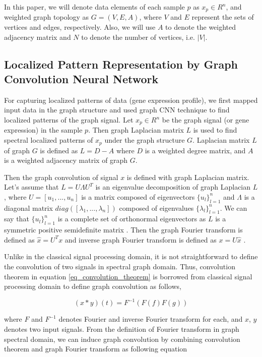 \documentclass{article}
\begin{document}
In this paper, we will denote data elements of each sample $p$ as $x_p \in R^n$, and weighted graph topology as $G = (V,E,A)$, where $V$ and $E$ represent the sets of vertices and edges, respectively. Also, we will use $A$ to denote the weighted adjacency matrix and $N$ to denote the number of vertices, i.e. $|V|$.



\subsection{Localized Pattern Representation by Graph Convolution Neural Network}
For capturing localized patterns of data (gene expression profile), we first mapped input data in the graph structure and used graph CNN technique to find localized patterns of the graph signal.
Let $x_p \in R^{n}$ be the graph signal (or gene expression) in the sample $p$.
Then graph Laplacian matrix $L$ is used to find spectral localized patterns of $x_p$ under the graph structure $G$. Laplacian matrix $L$ of graph $G$ is defined as $L = D - A$ where $D$ is a weighted degree matrix, and $A$ is a weighted adjacency matrix of graph $G$. 

Then the graph convolution of signal $x$ is defined with graph Laplacian matrix. Let's assume that $L = U\Lambda U^T$ is an eigenvalue decomposition of graph Laplacian $L$, where $U = [u_1, ... , u_n]$ is a matrix composed of eigenvectors $\{u_l\}_{l=1}^{n}$ and $\Lambda$ is a diagonal matrix $diag([\lambda_1,...,\lambda_n])$ composed of eigenvalues $\{\lambda_l\}_{l=1}^{n}$. We can say that  $\{u_l\}_{l=1}^{n}$ is a complete set of orthonormal eigenvectors as $L$ is a symmetric positive semidefinite matrix \cite{defferrard2016convolutional}. Then the graph Fourier transform is defined as $\hat{x} = U^Tx$ and inverse graph Fourier transform is defined as $x = U\hat{x}$ \cite{shuman2013emerging}.

Unlike in the classical signal processing domain, it is not straightforward to define the convolution of two signals in spectral graph domain. Thus, convolution theorem in equation \ref{eq_convolution_theorem} is borrowed from classical signal processing domain to define graph convolution as follows,

\begin{equation}
\label{eq_convolution_theorem}
(x*y)(t) =  F^{-1}(F(f)F(g))
\end{equation}

\noindent where $F$ and $F^{-1}$ denotes Fourier and inverse Fourier transform for each, and $x$, $y$ denotes two input signals. From the definition of Fourier transform in graph spectral domain, we can induce graph convolution by combining convolution theorem and graph Fourier transform as following equation
\end{document}
